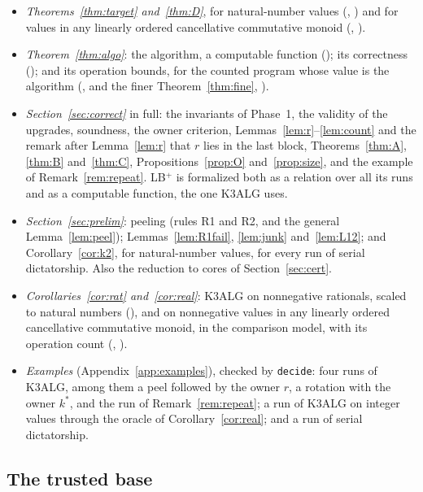 \documentclass[runningheads,11pt]{llncs}
\newcommand{\LBp}{\texorpdfstring{\mbox{LB$^{+}$}}{LB+}}
\begin{document}
\begin{itemize}
\item \emph{Theorems~\ref{thm:target} and~\ref{thm:D}}, for natural-number values (, ) and for values in any linearly ordered cancellative commutative monoid (, ).
\item \emph{Theorem~\ref{thm:algo}}: the algorithm, a computable function (); its correctness (); and its operation bounds, for the counted program whose value is the algorithm (, and the finer Theorem~\ref{thm:fine}, ).
\item \emph{Section~\ref{sec:correct}} in full: the invariants of Phase~1, the validity of the upgrades, soundness, the owner criterion, Lemmas~\ref{lem:r}--\ref{lem:count} and the remark after Lemma~\ref{lem:r} that $r$ lies in the last block, Theorems~\ref{thm:A}, \ref{thm:B} and~\ref{thm:C}, Propositions~\ref{prop:O} and~\ref{prop:size}, and the example of Remark~\ref{rem:repeat}. \LBp{} is formalized both as a relation over all its runs and as a computable function, the one K3ALG uses.
\item \emph{Section~\ref{sec:prelim}}: peeling (rules R1 and R2, and the general Lemma~\ref{lem:peel}); Lemmas~\ref{lem:R1fail}, \ref{lem:junk} and~\ref{lem:L12}; and Corollary~\ref{cor:k2}, for natural-number values, for every run of serial dictatorship. Also the reduction to cores of Section~\ref{sec:cert}.
\item \emph{Corollaries~\ref{cor:rat} and~\ref{cor:real}}: K3ALG on nonnegative rationals, scaled to natural numbers (), and on nonnegative values in any linearly ordered cancellative commutative monoid, in the comparison model, with its operation count (, ).
\item \emph{Examples} (Appendix~\ref{app:examples}), checked by \texttt{decide}: four runs of K3ALG, among them a peel followed by the owner $r$, a rotation with the owner $k^*$, and the run of Remark~\ref{rem:repeat}; a run of K3ALG on integer values through the oracle of Corollary~\ref{cor:real}; and a run of serial dictatorship.
\end{itemize}

\subsection{The trusted base}\label{sec:trusted}
\end{document}
